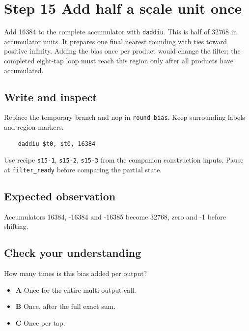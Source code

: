 \section{Step 15 Add half a scale unit once}\label{fir-s15}

Add 16384 to the complete accumulator with \texttt{daddiu}. This is half of 32768 in accumulator units. It prepares one final nearest rounding with ties toward positive infinity. Adding the bias once per product would change the filter; the completed eight-tap loop must reach this region only after all products have accumulated.

\subsection{Write and inspect}
Replace the temporary branch and nop in \texttt{round\_bias}. Keep surrounding labels and region markers.

\begin{verbatim}
    daddiu $t0, $t0, 16384
\end{verbatim}
Use recipe \texttt{s15-1}, \texttt{s15-2}, \texttt{s15-3} from the companion construction inputs. Pause at \texttt{filter\_ready} before comparing the partial state.

\subsection{Expected observation}
Accumulators 16384, -16384 and -16385 become 32768, zero and -1 before shifting.

\subsection{Check your understanding}
How many times is this bias added per output?

\begin{itemize}
  \item \textbf{A} Once for the entire multi-output call.
  \item \textbf{B} Once, after the full exact sum.
  \item \textbf{C} Once per tap.
\end{itemize}
